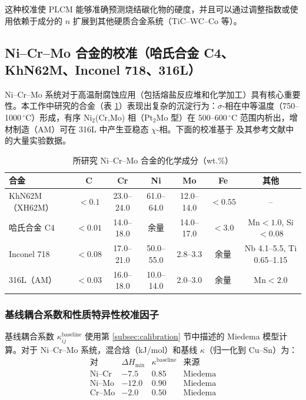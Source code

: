 \documentclass[12pt,a4paper]{article}
\begin{document}
	这种校准使 PLCM 能够准确预测烧结碳化物的硬度，并且可以通过调整指数或使用依赖于成分的 $n$ 扩展到其他硬质合金系统（TiC–WC–Co 等）。
	
	
	\subsection{Ni–Cr–Mo 合金的校准（哈氏合金 C4、KhN62M、Inconel 718、316L）}
	\label{subsec:calibration_nicrmo}
	
	Ni–Cr–Mo 系统对于高温耐腐蚀应用（包括熔盐反应堆和化学加工）具有核心重要性。本工作中研究的合金（表 \ref{tab:nicrmo_compositions}）表现出复杂的沉淀行为：$\sigma$-相在中等温度（750–1000\,\(^{\circ}\)C）形成，有序 Ni$_2$(Cr,Mo) 相（Pt$_2$Mo 型）在 500–600\,\(^{\circ}\)C 范围内析出，增材制造（AM）可在 316L 中产生亚稳态 $\chi$-相。下面的校准基于 \cite{dis2025} 及其参考文献中的大量实验数据。
	
	\begin{table}[htbp]
		\centering
		\caption{所研究 Ni–Cr–Mo 合金的化学成分（wt.\%）}
		\label{tab:nicrmo_compositions}
		\begin{tabular}{lcccccc}
			\toprule
			\textbf{合金} & \textbf{C} & \textbf{Cr} & \textbf{Ni} & \textbf{Mo} & \textbf{Fe} & \textbf{其他} \\
			\midrule
			KhN62M（XH62M） & \(<0.1\) & 23.0–24.0 & 61.0–64.0 & 12.0–14.0 & \(<0.55\) & – \\
			哈氏合金 C4   & \(<0.01\) & 14.0–18.0 & 余量 & 14.0–17.0 & \(<3.0\) & Mn\(<1.0\), Si\(<0.08\) \\
			Inconel 718    & \(<0.08\) & 17.0–21.0 & 50.0–55.0 & 2.8–3.3 & 余量 & Nb 4.1–5.5, Ti 0.65–1.15 \\
			316L（AM）      & \(<0.03\) & 16.0–18.0 & 10.0–14.0 & 2.0–3.0 & 余量 & Mn\(<2.0\) \\
			\bottomrule
		\end{tabular}
	\end{table}
	
	\subsubsection{基线耦合系数和性质特异性校准因子}
	基线耦合系数 $\kappa_{ij}^{\text{baseline}}$ 使用第 \ref{subsec:calibration} 节中描述的 Miedema 模型计算。对于 Ni–Cr–Mo 系统，混合焓（kJ/mol）和基线 $\kappa$（归一化到 Cu–Sn）为：
	\[
	\begin{array}{lccc}
		\text{对} & \Delta H_{\text{mix}} & \kappa^{\text{baseline}} & \text{来源} \\
		\hline
		\text{Ni–Cr} & -7.5 & 0.85 & \text{Miedema} \\
		\text{Ni–Mo} & -12.0 & 0.90 & \text{Miedema} \\
		\text{Cr–Mo} & -2.0 & 0.50 & \text{Miedema}
	\end{array}
	\]
	
\end{document}
